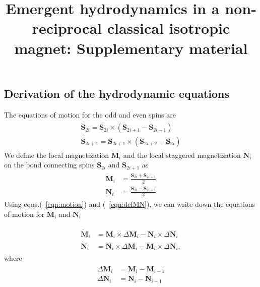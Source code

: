 \documentclass[prl,aps,twocolumn,nosuperscriptaddress,bibnotes,notitlepage,nofootinbib]{revtex4-2}
\newcommand{\magg}{\mathbf{M}}
\newcommand{\stagg}{\mathbf{N}}
\newcommand{\spin}{\mathbf{S}}
\begin{document}
\title{Emergent hydrodynamics in a non-reciprocal classical isotropic magnet: Supplementary material}

\maketitle
\renewcommand{\theequation}{S.\arabic{equation}}
\setcounter{equation}{0}

\subsection*{Derivation of the hydrodynamic equations}
The equations of motion for the odd and even spins are 
 \begin{align}
 \label{eqn:motion}
 \begin{split}    
 \dot{\spin}_{2i} = \spin_{2i} \times (\spin_{2i+1} - \spin_{2i-1}) \\
\dot{\spin}_{2i+1} = \spin_{2i+1} \times (\spin_{2i+2} - \spin_{2i})
\end{split}
\end{align}
We define the local magnetization $\magg_i$ and the local staggered magnetization $\stagg_i$ on the bond connecting spins $\spin_{2i}$ and $\spin_{2i+1}$ as
\begin{align}
\label{eqn:defMN}
\begin{split}
\magg_i & = \frac{\spin_{2i} + \spin_{2i+1}}{2} \\
\stagg_i & = \frac{\spin_{2i} - \spin_{2i+1}}{2}
\end{split}
\end{align}
Using eqns.(~\ref{eqn:motion}) and (~\ref{eqn:defMN}), we can write down the equations of motion for $\magg_i$ and $\stagg_i$

\begin{align}
    \label{eqn:contnutMN_discrete}
    \begin{split}
        \dot{\magg}_i &= \magg_i \times \Delta \magg_i - \stagg_i \times \Delta \stagg_i \\
        \dot{\stagg}_i &= \stagg_i \times \Delta \magg_i - \magg_i \times \Delta \stagg_i, 
    \end{split}
\end{align}
where 
\begin{align*}
\begin{split}
\Delta \magg_i &= \magg_i - \magg_{i-1} \\
\Delta \stagg_i &= \stagg_i - \stagg_{i-1}
\end{split}
\end{align*}
\end{document}
